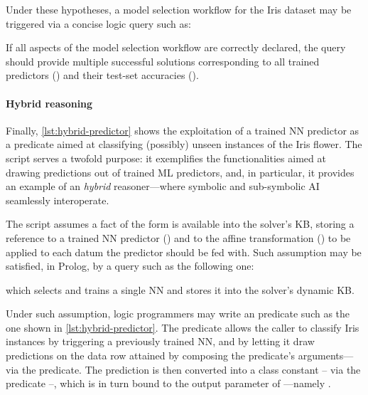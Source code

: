 \documentclass[12pt,a4paper,openright,twoside]{book}
\begin{document}
Under these hypotheses, a model selection workflow for the Iris dataset may be triggered via a concise logic query such as:
%
\begin{center}
\end{center}
%
If all aspects of the model selection workflow are correctly declared, the query should provide multiple successful solutions corresponding to all trained predictors () and their test-set accuracies ().

\paragraph{Hybrid reasoning}


Finally, \cref{lst:hybrid-predictor} shows the exploitation of a trained NN predictor as a predicate aimed at classifying (possibly) unseen instances of the Iris flower.
%
The script serves a twofold purpose: it exemplifies the \mllib{} functionalities aimed at drawing predictions out of trained ML predictors, and, in particular, it provides an example of an \emph{hybrid} reasoner---where symbolic and sub-symbolic AI seamlessly interoperate.

The script assumes a fact of the form  is available into the solver's KB, storing a reference to a trained NN predictor () and to the affine transformation () to be applied to each datum the predictor should be fed with.
%
Such assumption may be satisfied, in Prolog, by a query such as the following one:
%
\begin{center}
\end{center}
%
which selects and trains a single NN and stores it into the solver's dynamic KB.

Under such assumption, logic programmers may write an  predicate such as the one shown in \cref{lst:hybrid-predictor}.
%
The predicate allows the caller to classify Iris instances by triggering a previously trained NN, and by letting it draw predictions on the data row attained by composing the predicate's arguments---via the  predicate.
%
The prediction is then converted into a class constant -- via the  predicate --, which is in turn bound to the output parameter of ---namely .
\end{document}
